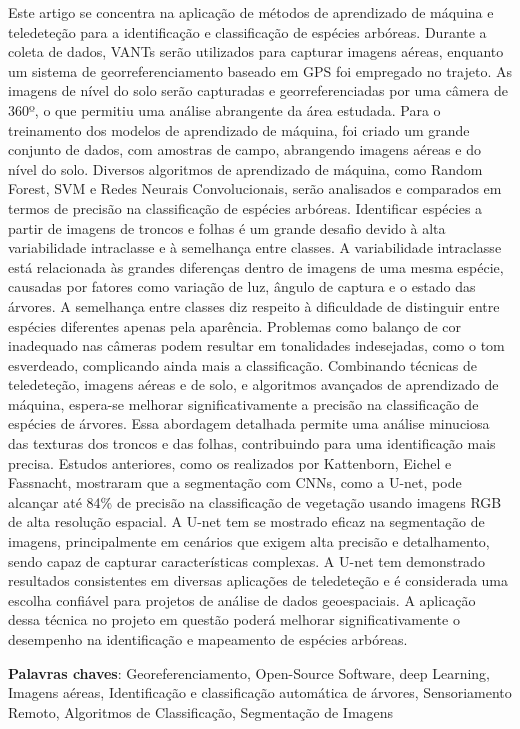 \documentclass[
    12pt,                   %
    openright,              %
    oneside,                %
    a4paper,                %
    sumario=tradicional,    %
    english,                %
    brazil,                 %
    ]{abntex2}
\begin{document}

\begin{resumo}
 \noindent
    Este artigo se concentra na aplicação de métodos de aprendizado de máquina e teledeteção para a identificação e classificação de espécies arbóreas. Durante a coleta de dados, VANTs serão utilizados para capturar imagens aéreas, enquanto um sistema de georreferenciamento baseado em GPS foi empregado no trajeto. As imagens de nível do solo serão capturadas e georreferenciadas por uma câmera de 360º, o que permitiu uma análise abrangente da área estudada. Para o treinamento dos modelos de aprendizado de máquina, foi criado um grande conjunto de dados, com amostras de campo, abrangendo imagens aéreas e do nível do solo. Diversos algoritmos de aprendizado de máquina, como Random Forest, SVM e Redes Neurais Convolucionais, serão analisados e comparados em termos de precisão na classificação de espécies arbóreas. Identificar espécies a partir de imagens de troncos e folhas é um grande desafio devido à alta variabilidade intraclasse e à semelhança entre classes. A variabilidade intraclasse está relacionada às grandes diferenças dentro de imagens de uma mesma espécie, causadas por fatores como variação de luz, ângulo de captura e o estado das árvores. A semelhança entre classes diz respeito à dificuldade de distinguir entre espécies diferentes apenas pela aparência. Problemas como balanço de cor inadequado nas câmeras podem resultar em tonalidades indesejadas, como o tom esverdeado, complicando ainda mais a classificação. Combinando técnicas de teledeteção, imagens aéreas e de solo, e algoritmos avançados de aprendizado de máquina, espera-se melhorar significativamente a precisão na classificação de espécies de árvores. Essa abordagem detalhada permite uma análise minuciosa das texturas dos troncos e das folhas, contribuindo para uma identificação mais precisa. Estudos anteriores, como os realizados por Kattenborn, Eichel e Fassnacht, mostraram que a segmentação com CNNs, como a U-net, pode alcançar até 84\% de precisão na classificação de vegetação usando imagens RGB de alta resolução espacial. A U-net tem se mostrado eficaz na segmentação de imagens, principalmente em cenários que exigem alta precisão e detalhamento, sendo capaz de capturar características complexas. A U-net tem demonstrado resultados consistentes em diversas aplicações de teledeteção e é considerada uma escolha confiável para projetos de análise de dados geoespaciais. A aplicação dessa técnica no projeto em questão poderá melhorar significativamente o desempenho na identificação e mapeamento de espécies arbóreas.
 \vspace{\onelineskip}

 \noindent
 \textbf{Palavras chaves}: Georeferenciamento, Open-Source Software, deep Learning, Imagens aéreas, Identificação e classificação automática de árvores, Sensoriamento Remoto, Algoritmos de Classificação, Segmentação de Imagens
\end{resumo}
\end{document}
